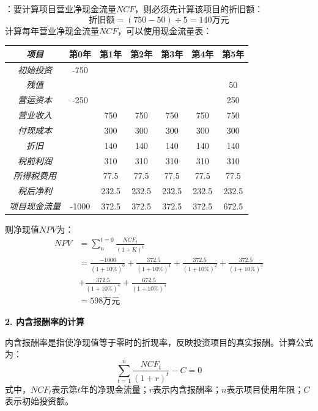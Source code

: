 \documentclass[
  10pt,
  twoside,
  openany,
  b5paper, %
  colorscheme = black, %
  xits = false,
]{qyxf-book}
\begin{document}
\solve[答]：要计算项目营业净现金流量$NCF$，则必须先计算该项目的折旧额：
\begin{equation*}
	\text{折旧额} = (750-50) \div 5 = 140 \text{万元}
\end{equation*}
计算每年营业净现金流量$NCF$，可以使用现金流量表：
\begin{center}
	\begin{tabular}{ccccccc}
		\toprule
		\emph{项目} & 第0年 & 第1年 & 第2年 & 第3年 & 第4年 & 第5年 \\
		\midrule
		\emph{初始投资} & -750 & & & & & \\
		\emph{残值} & & & & & & 50 \\
		\emph{营运资本} & -250 & & & & & 250 \\
		\emph{营业收入} &  & 750 & 750 & 750 & 750 & 750 \\
		\emph{付现成本} & & 300 & 300 & 300 & 300 & 300 \\
		\emph{折旧} & & 140 & 140 & 140 & 140 & 140 \\
		\emph{税前利润} & & 310 & 310 & 310 & 310 & 310 \\
		\emph{所得税费用} & & 77.5 & 77.5 & 77.5 & 77.5 & 77.5 \\
		\emph{税后净利} & & 232.5 & 232.5 & 232.5 & 232.5 & 232.5 \\
		\emph{项目现金流量} & -1000  & 372.5 & 372.5 & 372.5 & 372.5 & 672.5 \\
		\bottomrule
	\end{tabular}
\end{center}

则净现值$NPV$为：
\begin{equation*}
	\begin{aligned}
		NPV &= \sum_{n}^{t=0} \frac{NCF_t}{(1+K)^t} \\
		&= \frac{-1000}{(1+10\%)^0} + \frac{372.5}{(1+10\%)^1} + \frac{372.5}{(1+10\%)^2} + \frac{372.5}{(1+10\%)^3} \\[1.5ex] &+  \frac{372.5}{(1+10\%)^4} +
		\frac{672.5}{(1+10\%)^5} \\[1.5ex]
		&= 598 \text{万元}
	\end{aligned}
\end{equation*}

\textbf{2. 内含报酬率的计算}

内含报酬率是指使净现值等于零时的折现率，反映投资项目的真实报酬。计算公式为：
\begin{equation*}
	\sum_{t=1}^{n} \frac{NCF_t}{(1+r)^t}-C =0
\end{equation*}
式中，$NCF_t$表示第$t$年的净现金流量；$r$表示内含报酬率；$n$表示项目使用年限；$C$表示初始投资额。
\end{document}
